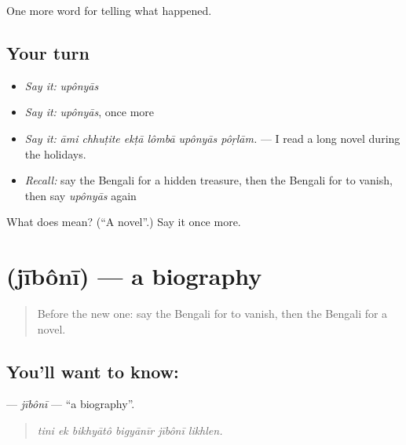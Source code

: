 \begin{grammarlens}[title={What you've built}]
One more word for telling what happened.
\end{grammarlens}

\subsection*{Your turn}
\begin{itemize}
\raggedright
  \item \emph{Say it:} \emph{upônyās}
  \item \emph{Say it:} \emph{upônyās}, once more
  \item \emph{Say it:} \emph{āmi chhuṭite ekṭā lômbā upônyās pôṛlām.} — I read a long novel during the holidays.
  \item \emph{Recall:} say the Bengali for a hidden treasure, then the Bengali for to vanish, then say \emph{upônyās} again
\end{itemize}

\begin{tcolorbox}[breakable,colback=teal!4,colframe=teal!35!black,title={Before you move on}]
What does  mean? (\textquotedblleft{}A novel\textquotedblright{}.) Say it once more.
\end{tcolorbox}
\section[\texorpdfstring{\bn{জীবনী} (jībônī)}{জীবনী (jībônī)}]{ (jībônī) — a biography}

\label{lesson:BN-C327-jiboni}



\begin{quote}
Before the new one: say the Bengali for to vanish, then the Bengali for a novel.
\end{quote}

\subsection*{You'll want to know: }
\textbf{} — \emph{jībônī} — \textquotedblleft{}a biography\textquotedblright{}.

\begin{quote}
     
\end{quote}

\begin{quote}
\emph{tini ek bikhyātô bigyānīr jībônī likhlen.}
\end{quote}

